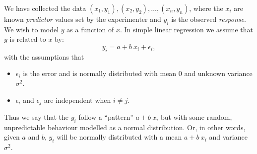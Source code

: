 \documentclass[a4paper,11pt,oneside,onecolumn]{book}
\begin{document}
We have collected the data
$(x_1,y_1),(x_2,y_2),\ldots,(x_n,y_n)$, where the $x_i$ are known
{\it predictor} values set by the experimenter and $y_i$ is the
observed {\it response}. We wish to model $y$ as a function of $x$.
In simple linear regression we assume that $y$ is related to $x$ by:
\[ y_i = a + b\  x_i + \epsilon_i, \]
with the assumptions that 
\begin{itemize}
\item $\epsilon_i$ is the error and is normally distributed with
mean 0 and unknown variance $\sigma^2$.
\item $\epsilon_i$ and $\epsilon_j$ are independent when $i\neq j$.
\end{itemize}
 Thus we say that the $y_i$
follow a ``pattern'' $a + b\ x_i$ but with some random,
unpredictable behaviour modelled as a normal distribution. Or, in
other words, given $a$ and $b$, $y_i$ will be normally
distributed with a mean $a + b \ x_i$ and variance
$\sigma^2$.
\end{document}
